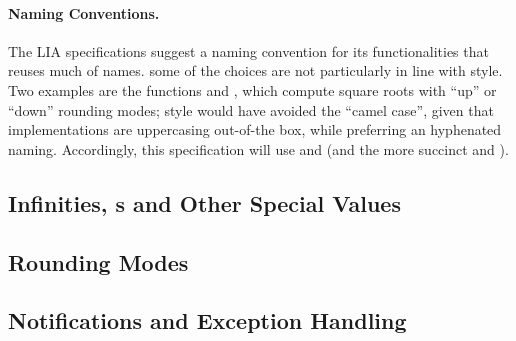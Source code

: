 \documentclass[../../CDR-IEEE-754-support.tex]{subfiles}
\begin{document}
\paragraph{Naming Conventions.}
%
The LIA specifications suggest a naming convention for its
functionalities that reuses much of \CL{} names.  some of the choices
are not particularly in line with \CL{} style.  Two examples are the
functions  and , which compute square roots
with ``up'' or ``down'' rounding modes; \CL{} style would have avoided
the ``camel case'', given that \CL{} implementations are uppercasing
out-of-the box, while preferring an hyphenated naming.  Accordingly,
this specification will use  and
 (and the more succinct  and ).




\subsection{Infinities, s and Other Special Values}



\subsection{Rounding Modes}



\subsection{Notifications and Exception Handling}


\end{document}
